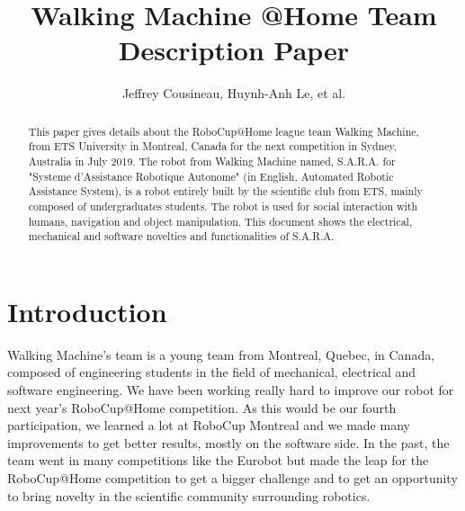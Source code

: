 \documentclass[runningheads,a4paper]{llncs}
\begin{document}
\newif\ifdraft
\draftfalse


\ifdraft
\setlength{\belowcaptionskip}{-5pt}
\fi

\title{Walking Machine @Home \newline {} Team Description Paper}

\author{Jeffrey Cousineau, Huynh-Anh Le, et al.}
\maketitle



\begin{abstract}

This paper gives details about the RoboCup@Home league team Walking Machine, from ETS University in Montreal, Canada for the next competition in Sydney, Australia in July 2019. The robot from Walking Machine named, S.A.R.A. for "Systeme d'Assistance Robotique Autonome" (in English, Automated Robotic Assistance System), is a robot entirely built by the scientific club from ETS, mainly composed of undergraduates students. The robot is used for social interaction with humans, navigation and object manipulation. This document shows the electrical, mechanical and software novelties and functionalities of S.A.R.A.

\end{abstract}


\section{Introduction}
\tab Walking Machine’s team is a young team from Montreal, Quebec, in Canada, composed of engineering students in the field of mechanical, electrical and software engineering. We have been working really hard to improve our robot for next year's RoboCup@Home competition. As this would be our fourth participation, we learned a lot at RoboCup Montreal and we made many improvements to get better results, mostly on the software side. In the past, the team went in many competitions like the Eurobot but made the leap for the RoboCup@Home competition to get a bigger challenge and to get an opportunity to bring novelty in the scientific community surrounding robotics.\\
\end{document}
